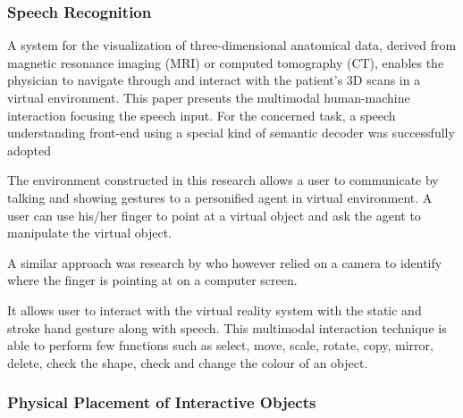 \subsubsection{Speech Recognition}

A system for the visualization of three-dimensional anatomical data, derived from magnetic resonance imaging (MRI) or computed tomography (CT), enables the physician to navigate through and interact with the patient's 3D scans in a virtual environment. This paper presents the multimodal human-machine interaction focusing the speech input. For the concerned task, a speech understanding front-end using a special kind of semantic decoder was successfully adopted
\cite{Muller1998}

The environment constructed in this research allows a user to communicate by talking and showing gestures
to a personified agent in virtual environment. A user can use his/her finger to point at a virtual object and ask the agent to manipulate the virtual object.
\cite{Uchino2008}

A similar approach was research by \cite{Uchino2008} who however relied on a camera to identify where the finger is pointing at on a computer screen.

It allows user to interact with the virtual reality system with the static and stroke hand gesture along with speech. This multimodal interaction technique is able to perform few functions such as select, move, scale, rotate, copy, mirror, delete, check the shape, check and change the colour of an object.
\cite{Chun2015}


\subsubsection{Physical Placement of Interactive Objects}

